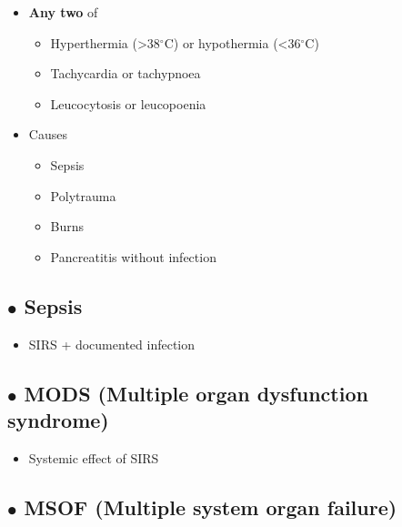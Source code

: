 \documentclass[
  12pt,
]{memoir}
\providecommand{\tightlist}{%
  \setlength{\itemsep}{0pt}\setlength{\parskip}{0pt}}
\begin{document}
\begin{itemize}
\tightlist
\item
  \textbf{Any two} of

  \begin{itemize}
  \tightlist
  \item
    Hyperthermia (\textgreater38\(^\circ\)C) or hypothermia
    (\textless36\(^\circ\)C)
  \item
    Tachycardia or tachypnoea
  \item
    Leucocytosis or leucopoenia
  \end{itemize}
\item
  Causes

  \begin{itemize}
  \tightlist
  \item
    Sepsis
  \item
    Polytrauma
  \item
    Burns
  \item
    Pancreatitis without infection
  \end{itemize}
\end{itemize}

\hypertarget{bullet-sepsis}{%
\subsection{\texorpdfstring{\(\bullet\)
Sepsis}{\textbackslash bullet Sepsis}}\label{bullet-sepsis}}

\begin{itemize}
\tightlist
\item
  SIRS + documented infection
\end{itemize}

\hypertarget{bullet-mods-multiple-organ-dysfunction-syndrome}{%
\subsection{\texorpdfstring{\(\bullet\) MODS (Multiple organ dysfunction
syndrome)}{\textbackslash bullet MODS (Multiple organ dysfunction syndrome)}}\label{bullet-mods-multiple-organ-dysfunction-syndrome}}

\begin{itemize}
\tightlist
\item
  Systemic effect of SIRS
\end{itemize}

\hypertarget{bullet-msof-multiple-system-organ-failure}{%
\subsection{\texorpdfstring{\(\bullet\) MSOF (Multiple system organ
failure)}{\textbackslash bullet MSOF (Multiple system organ failure)}}\label{bullet-msof-multiple-system-organ-failure}}
\end{document}

